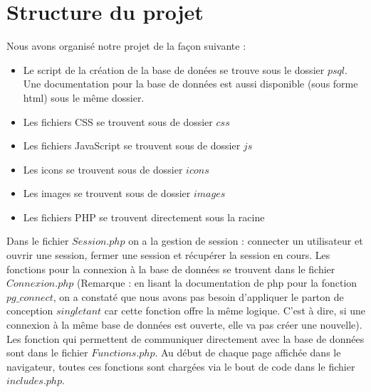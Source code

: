 \documentclass[a4paper, 11pt]{article}
\begin{document}
\section{Structure du projet}
Nous avons organisé notre projet de la façon suivante :
\begin{itemize} 
	\item Le script de la création de la base de donées se trouve sous le dossier $psql$. Une documentation pour la base de données est aussi disponible (sous forme html) sous le même dossier.
	\item Les fichiers CSS se trouvent sous de dossier $css$
	\item Les fichiers JavaScript se trouvent sous de dossier $js$
	\item Les icons se trouvent sous de dossier $icons$
	\item Les images se trouvent sous de dossier $images$
	\item Les fichiers PHP se trouvent directement sous la racine
\end{itemize}
Dans le fichier $Session.php$ on a la gestion de session : connecter un utilisateur et ouvrir une session, fermer une session et récupérer la session en cours. Les fonctions pour la connexion à la base de données se trouvent dans le fichier $Connexion.php$ (Remarque : en lisant la documentation de php pour la fonction $pg\_connect$, on a constaté que nous avons pas besoin d'appliquer le parton de conception $singletant$ car cette fonction offre la même logique. C'est à dire, si une connexion à la même base de données est ouverte, elle va pas créer une nouvelle). Les fonction qui permettent de communiquer directement avec la base de données sont dans le fichier $Functions.php$.
\newline Au début de chaque page affichée dans le navigateur, toutes ces fonctions sont chargées via le bout de code dans le fichier $includes.php$.
\end{document}
